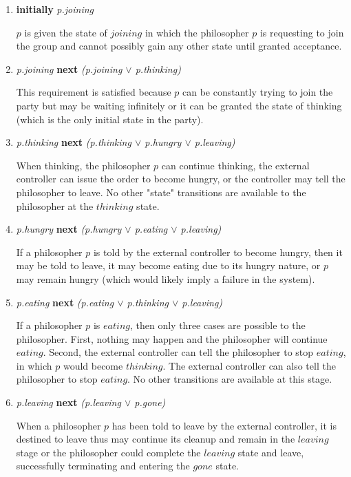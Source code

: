 \documentclass[11pt]{article}
\begin{document}
\begin{enumerate}[S1]
\item {\bfseries initially} {\it p.joining}

$p$ is given the state of $joining$ in which the philosopher $p$ is requesting to join the group and cannot possibly gain any other state until granted acceptance.

\item {\it p.joining} {\bfseries next} {\it (p.joining $\vee$ p.thinking)}

This requirement is satisfied because $p$ can be constantly trying to join the party but may be waiting infinitely or it can be granted the state of thinking (which is the only initial state in the party).

\item {\it p.thinking} {\bfseries next} {\it (p.thinking $\vee$ p.hungry $\vee$ p.leaving)}

When thinking, the philosopher $p$ can continue thinking, the external controller can issue the order to become hungry, or the controller may tell the philosopher to leave. No other "state" transitions are available to the philosopher at the $thinking$ state. 

\item {\it p.hungry} {\bfseries next} {\it (p.hungry $\vee$ p.eating $\vee$ p.leaving)}

If a philosopher $p$ is told by the external controller to become hungry, then it may be told to leave, it may become eating due to its hungry nature, or $p$ may remain hungry (which would likely imply a failure in the system).

\item {\it p.eating} {\bfseries next} {\it (p.eating $\vee$ p.thinking $\vee$ p.leaving)}

If a philosopher $p$ is $eating$, then only three cases are possible to the philosopher. First, nothing may happen and the philosopher will continue $eating$. Second, the external controller can tell the philosopher to stop $eating$, in which $p$ would become $thinking$. The external controller can also tell the philosopher to stop $eating$. No other transitions are available at this stage.


\item {\it p.leaving} {\bfseries next} {\it (p.leaving $\vee$ p.gone)}

When a philosopher $p$ has been told to leave by the external controller, it is destined to leave thus may continue its cleanup and remain in the $leaving$ stage or the philosopher could complete the $leaving$ state and leave, successfully terminating and entering the $gone$ state.


\end{enumerate}
\end{document}
